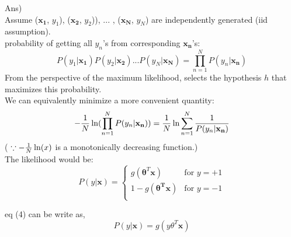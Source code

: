 \documentclass[12pt]{article}%
\begin{document}
Ans)\\
Assume ($\mathbf{x_1}$, $y_1$), ($\mathbf{x_2}$, $y_2$)), $...$ , ($\mathbf{x_N}$, $y_N$) are independently generated (iid assumption).\\
probability of getting all $y_n$'s from corresponding $\mathbf{x_n}$'s:
\begin{equation}
	P(y_1 | \mathbf{x_1})P(y_2 | \mathbf{x_2}) ... P(y_N | \mathbf{x_N}) = \prod_{n=1}^{N} {P(y_n | \mathbf{x_n})}
\end{equation}
From the perspective of the maximum likelihood, selects the hypothesis $h$ that maximizes this probability.\\
We can equivalently minimize a more convenient quantity: 
\begin{equation}
	- {1 \over N} \ln (\prod_{n=1}^{N} {P(y_n | \mathbf{x_n})}) = {1 \over N} \ln \sum_{n=1}^{N} {1 \over P(y_n | \mathbf{x_n})}
\end{equation}
( $\because - {1 \over N} \ln(x)$ is a monotonically decreasing function.)\\
The likelihood would be:
\begin{equation}
	P(y | \mathbf{x}) = 
	\begin{cases}
		g(\mathbf{\theta}^T\mathbf{x}) & \text{for $y = +1$}\\
		1 - g(\mathbf{\theta^T}\mathbf{x}) & \text{for $y = -1$}\\
	\end{cases}
\end{equation}

eq (4) can be write as,
\begin{equation}
	P(y | \mathbf{x})=  g(y \theta^T \mathbf{x})
\end{equation}
\end{document}
